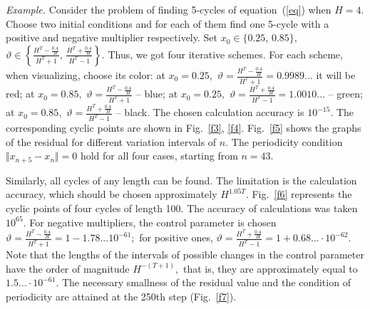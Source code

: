 \documentclass[12pt,a4paper]{amsart}
\begin{document}
\textit{Example.} Consider the problem of finding 5-cycles of equation~(\ref{eq}) when $H=4.$ Choose two initial conditions and for each of them find one 
5-cycle with a positive and negative multiplier respectively. Set $x_0 \in \{0.25,\,0.85\},$ 
$\vartheta \in \left\{\frac{H^T - \frac{0.4}{H}}{H^T+1},\,\frac{H^T + \frac{0.4}{H}}{H^T-1} \right\}.$ Thus, we got four iterative 
schemes. For each scheme, when visualizing, choose its color: at $x_0=0.25,$ $\vartheta = \frac{H^T - \frac{0.4}{H}}{H^T+1}=0.9989...$ 
it will be red; at $x_0=0.85,$ $\vartheta = \frac{H^T - \frac{0.4}{H}}{H^T+1}$ -- blue; at $x_0=0.25,$
$\vartheta = \frac{H^T + \frac{0.4}{H}}{H^T-1}=1.0010...$ -- green; at $x_0=0.85,$ $\vartheta = \frac{H^T + \frac{0.4}{H}}{H^T-1}$ --
black. The chosen calculation accuracy is $10^{-15}.$ The corresponding cyclic points are shown in Fig.~\ref{f3}, \ref{f4}. Fig.~\ref{f5} shows 
the graphs of the residual for different variation intervals of $n.$ The periodicity condition $\Vert x_{n+5} - x_n\Vert=0$ hold for all four cases, 
starting from $n=43.$

Similarly, all cycles of any length can be found. The limitation is the calculation accuracy, which should be chosen approximately $H^{1.05 T}$.
Fig.~\ref{f6} represents the cyclic points of four cycles of length 100. The accuracy of calculations was taken $10^{65}.$ For negative multipliers, 
the control parameter is chosen $\vartheta = \frac{H^T - \frac{0.4}{H}}{H^T+1}=1 - 1.78...10^{-61};$ for positive ones, 
$\vartheta = \frac{H^T + \frac{0.4}{H}}{H^T-1} = 1 + 0.68...\cdot10^{-62}.$ Note that the lengths of the intervals of possible changes 
in the control parameter have the order of magnitude $H^{-(T+1)},$ that is, they are approximately equal to $1.5...\cdot 10^{-61}.$ 
The necessary smallness of the residual value and the condition of periodicity are attained at the 250th step (Fig.~\ref{f7}).
\end{document}
